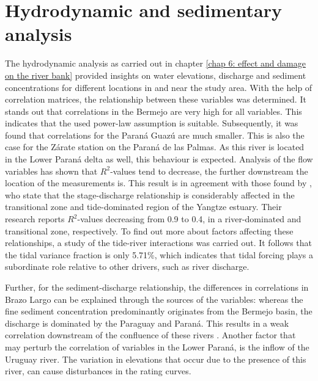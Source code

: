 \section{Hydrodynamic and sedimentary analysis}
The hydrodynamic analysis as carried out in chapter \ref{chap 6: effect and damage on the river bank} provided insights on water elevations, discharge and sediment concentrations for different locations in and near the study area. With the help of correlation matrices, the relationship between these variables was determined. It stands out that correlations in the Bermejo are very high for all variables. This indicates that the used power-law assumption is suitable. Subsequently, it was found that correlations for the Paraná Guazú are much smaller. This is also the case for the Zárate station on the Paraná de las Palmas. As this river is located in the Lower Paraná delta as well, this behaviour is expected. Analysis of the flow variables has shown that $R^2$-values tend to decrease, the further downstream the location of the measurements is. This result is in agreement with those found by \textcite{songEvaluatingUnderstandingTideriver2024}, who state that the stage-discharge relationship is considerably affected in the transitional zone and tide-dominated region of the Yangtze estuary. Their research reports $R^2$-values decreasing from 0.9 to 0.4, in a river-dominated and transitional zone, respectively. To find out more about factors affecting these relationships, a study of the tide-river interactions was carried out. It follows that the tidal variance fraction is only 5.71\%, which indicates that tidal forcing plays a subordinate role relative to other drivers, such as river discharge.

Further, for the sediment-discharge relationship, the differences in correlations in Brazo Largo can be explained through the sources of the variables: whereas the fine sediment concentration predominantly originates from the Bermejo basin, the discharge is dominated by the Paraguay and Paraná. This results in a weak correlation downstream of the confluence of these rivers \autocite{lopezweibelSourcesTemporalDynamics2022}. Another factor that may perturb the correlation of variables in the Lower Paraná, is the inflow of the Uruguay river. The variation in elevations that occur due to the presence of this river, can cause disturbances in the rating curves. 

